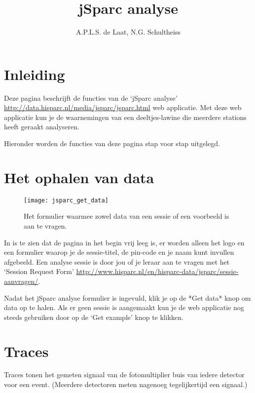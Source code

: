 

\title{jSparc analyse}
\author{A.P.L.S. de Laat, N.G. Schultheiss}



\maketitle

\section{Inleiding}

Deze pagina beschrijft de functies van de `jSparc analyse' 
\url{http://data.hisparc.nl/media/jsparc/jsparc.html} web
applicatie. Met deze web applicatie kun je de waarnemingen van een 
deeltjes-lawine die meerdere stations heeft geraakt analyseren.

Hieronder worden de functies van deze pagina stap voor stap uitgelegd.

\section{Het ophalen van data}

\begin{figure}[ht]
    \centering
    \texttt{[image: jsparc\_get\_data]}
    \caption{Het formulier waarmee zowel data van een sessie of een voorbeeld is aan te 
   		vragen.}
    \label{fig:get_data}
\end{figure}

In  is te zien dat de pagina in het begin vrij leeg is, er worden alleen het \hisparc logo en een
formulier waarop je de sessie-titel, de pin-code en je naam kunt invullen 
afgebeeld. Een analyse sessie is door jou of je leraar aan te vragen met het 
`Session Request Form'
\url{http://www.hisparc.nl/en/hisparc-data/jsparc/sessie-aanvragen/}.

Nadat het jSparc analyse formulier is ingevuld, klik je op de *Get data* knop 
om data op te halen. Als er geen sessie is aangemaakt kun je de web applicatie 
nog steeds gebruiken door op de `Get example' knop te klikken.

\section{Traces}

Traces tonen het gemeten signaal van de fotomultiplier buis van iedere detector
voor een event. (Meerdere detectoren meten nagenoeg tegelijkertijd een 
signaal.)

